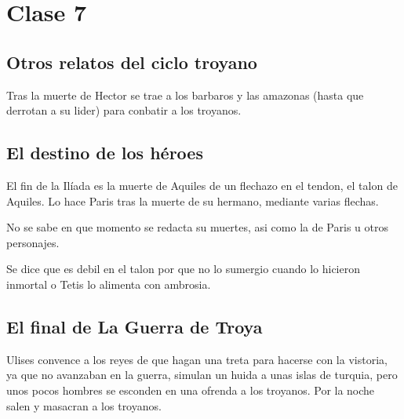 \chapter{Clase 7}\label{ch:clase7}

\section{Otros relatos del ciclo troyano}
Tras la muerte de Hector se trae a los barbaros y las amazonas (hasta que derrotan a su lider) para conbatir a los troyanos.

\section{El destino de los héroes}
El fin de la Ilíada es la muerte de Aquiles de un flechazo en el tendon, el talon de Aquiles. Lo hace Paris tras la muerte de su hermano, mediante varias flechas.

No se sabe en que momento se redacta su muertes, asi como la de Paris u otros personajes.

Se dice que es debil en el talon por que no lo sumergio cuando lo hicieron inmortal o Tetis lo alimenta con ambrosia.

\section{El final de La Guerra de Troya}
Ulises convence a los reyes de que hagan una treta para hacerse con la vistoria, ya que no avanzaban en la guerra, simulan un huida a unas islas de turquia, pero unos pocos hombres se esconden en una ofrenda a los troyanos. Por la noche salen y masacran a los troyanos.

